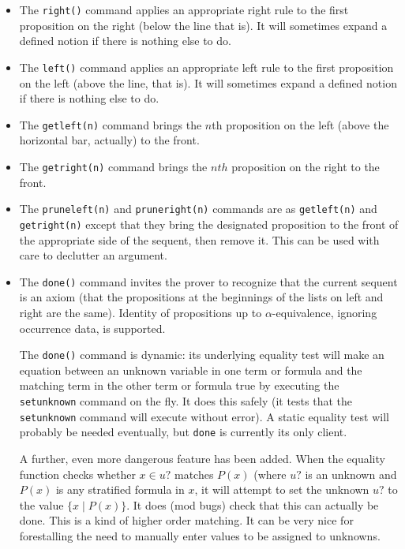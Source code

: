 \documentclass{article}
\begin{document}
\begin{itemize}

\item The {\tt right()} command applies an appropriate right rule to the first proposition on the right (below the line that is).  It will sometimes expand a defined notion if there is nothing else to do.

\item The {\tt left()} command applies an appropriate left rule to the first proposition on the left (above the line, that is).  It will sometimes expand a defined notion if there is nothing else to do.

\item  The {\tt getleft(n)} command brings the $n$th proposition on the left (above the horizontal bar, actually) to the front.

\item The {\tt getright(n)} command brings the $nth$ proposition on the right to the front.

\item The {\tt pruneleft(n)} and {\tt pruneright(n)} commands are as {\tt getleft(n)} and {\tt getright(n)} except that they bring the designated proposition to the front of the appropriate side of the sequent, then remove it.  This can be used with care to declutter an argument.

\item The {\tt done()} command invites the prover to recognize that the current sequent is an axiom (that the propositions at the beginnings of the lists on left and right are the same).  Identity of propositions up to $\alpha$-equivalence, ignoring occurrence data, is supported.

The {\tt done()} command is dynamic:  its underlying equality test will make an equation between an unknown variable in one term or formula and the matching term in the other term or formula true by executing the {\tt setunknown} command on the fly.  It does this safely (it tests that the
{\tt setunknown} command will execute without error).  A static equality test will probably be needed eventually, but {\tt done} is currently its only client.

A further, even more dangerous feature has been added.  When the equality function checks whether $x \in u?$ matches $P(x)$
(where $u?$ is an unknown and $P(x)$ is any stratified formula in $x$, it will attempt to set the unknown $u?$ to the value $\{x\mid P(x)\}$.  It does (mod bugs) check that this can actually be done.
This is a kind of higher order matching.  It can be very nice for forestalling the need to manually enter values to be assigned to unknowns.


\end{itemize}
\end{document}
